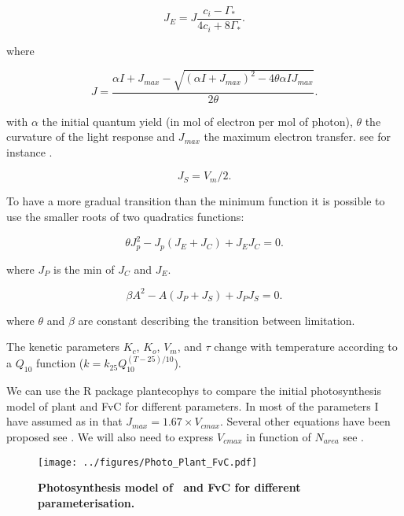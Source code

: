 \documentclass[a4paper,11pt]{article}
\begin{document}
\begin{equation}
\label{eq:JCb}
J_E = J \frac{ c_i - \Gamma_*}{4c_i + 8 \Gamma_*}.
\end{equation}

where

\begin{equation}
\label{eq:Jlight}
J = \frac{ \alpha I + J_{max} - \sqrt{(\alpha I + J_{max})^2 - 4 \theta \alpha I J_{max}}}{2\theta}.
\end{equation}

with $\alpha$ the initial quantum yield (in mol of electron per mol of photon), $\theta$ the curvature of the light response and $J_{max}$ the maximum electron transfer.
see for instance \citet{Bernacchi-2009}.


\begin{equation}
\label{eq:JS}
J_S= V_m/2.
\end{equation}

To have a more gradual transition than the minimum function it is possible to use the smaller roots of two quadratics functions:

\begin{equation}
\label{eq:Q1}
\theta J_p^2 - J_p(J_E+J_C) + J_E J_C= 0.
\end{equation}

where $J_P$ is the min of $J_C$ and $J_E$.

\begin{equation}
\label{eq:Q2}
\beta A^2 - A(J_P+J_S) + J_P J_S= 0.
\end{equation}

where $\theta$ and $\beta$ are constant describing the transition between limitation.

The kenetic parameters $K_c$, $K_o$, $V_m$, and $\tau$ change with temperature according to a $Q_{10}$ function ($k = k_{25} Q_{10}^{(T-25)/10}$).

\clearpage

We can use the R package plantecophys \citep{Duursma-2015} to compare the initial photosynthesis model of plant and FvC for different parameters. In most of the parameters I have assumed as in \citet{Medlyn-2002} that $J_{max} = 1.67 \times V_{cmax}$. Several other equations have been proposed see \citet{Walker-2014,Kattge-2011}. We will also need to express $V_{cmax}$ in function of $N_{area}$ see \citep{Kattge-2009,Domingues-2010}. 


\begin{figure}[ht]
\centering
\texttt{[image: ../figures/Photo\_Plant\_FvC.pdf]}
\caption{\textbf{Photosynthesis model of \plant\ and FvC for different parameterisation.}
\label{fig:photo}}
\end{figure}
\end{document}
